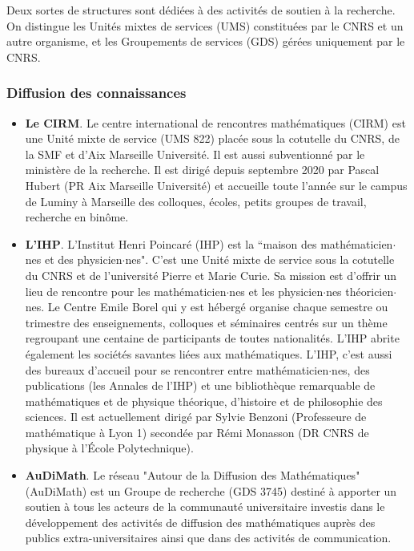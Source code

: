 Deux sortes de structures sont d\'edi\'ees \`a des activit\'es de soutien \`a la recherche. 
On distingue les Unit\'es mixtes de services (UMS)
constitu\'ees par le CNRS et un autre organisme, et les Groupements de services (GDS)
g\'er\'ees  uniquement par le CNRS.


\subsubsection{Diffusion des connaissances}

\begin{itemize}
\item {\bf Le CIRM}.
Le centre international de rencontres math\'ematiques (CIRM) est une
Unit\'e mixte de service (UMS 822)  plac\'ee sous la cotutelle du CNRS, de la SMF et d'Aix Marseille Universit\'e. Il est aussi subventionn\'e par le minist\`ere de la recherche. Il est dirig\'e depuis septembre 2020
par Pascal Hubert (PR Aix Marseille Universit\'e) et
accueille toute l'ann\'ee sur le campus de Luminy \`a Marseille des colloques, \'ecoles, petits groupes de travail,
recherche en bin\^ome. \\
\item{\bf L'IHP}.
L'Institut Henri Poincar\'e (IHP) est la ``maison des
math\'ematicien$\cdot$nes et des physicien$\cdot$nes". C'est une Unit\'e mixte de service sous la cotutelle 
du CNRS et  de l'universit\'e Pierre et Marie Curie. Sa mission est d'offrir un lieu de rencontre pour les math\'ematicien$\cdot$nes et les physicien$\cdot$nes th\'eoricien$\cdot$nes. Le Centre Emile Borel qui y est h\'eberg\'e organise chaque semestre ou trimestre des enseignements, colloques et s\'eminaires centr\'es sur un th\`eme regroupant une centaine de participants de toutes nationalit\'es. L'IHP abrite \'egalement les soci\'et\'es savantes li\'ees aux math\'ematiques.
L'IHP, c'est aussi des bureaux d'accueil pour se rencontrer entre math\'ematicien$\cdot$nes, des publications (les Annales de l'IHP)
et une biblioth\`eque remarquable de math\'ematiques et de physique th\'eorique, d'histoire et de philosophie des sciences. Il est actuellement dirig\'e par Sylvie Benzoni (Professeure de math\'ematique à Lyon 1) second\'ee par R\'emi Monasson (DR CNRS de physique à l'\'Ecole Polytechnique).
\\
\item{\bf AuDiMath}. Le r\'eseau "Autour de la Diffusion des Math\'ematiques" (AuDiMath) est un Groupe de recherche (GDS 3745)  destin\'e \`a apporter un soutien \`a tous les acteurs de la communaut\'e universitaire investis dans le d\'eveloppement des activit\'es de diffusion des math\'ematiques aupr\`es des publics extra-universitaires ainsi que dans des activit\'es de communication.\\
\end{itemize}

